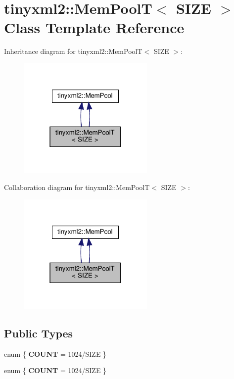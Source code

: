 \hypertarget{classtinyxml2_1_1MemPoolT}{}\section{tinyxml2\+:\+:Mem\+PoolT$<$ S\+I\+ZE $>$ Class Template Reference}
\label{classtinyxml2_1_1MemPoolT}


Inheritance diagram for tinyxml2\+:\+:Mem\+PoolT$<$ S\+I\+ZE $>$\+:
\nopagebreak
\begin{figure}[H]
\begin{center}
\leavevmode
\includegraphics[width=187pt]{classtinyxml2_1_1MemPoolT__inherit__graph}
\end{center}
\end{figure}


Collaboration diagram for tinyxml2\+:\+:Mem\+PoolT$<$ S\+I\+ZE $>$\+:
\nopagebreak
\begin{figure}[H]
\begin{center}
\leavevmode
\includegraphics[width=187pt]{classtinyxml2_1_1MemPoolT__coll__graph}
\end{center}
\end{figure}
\subsection*{Public Types}
\begin{DoxyCompactItemize}
\item 
\mbox{\label{classtinyxml2_1_1MemPoolT_a51bbb467703cd3d5aae62939f048a88f}} 
enum \{ {\bfseries C\+O\+U\+NT} = 1024/\+S\+I\+ZE
 \}
\item 
\mbox{\label{classtinyxml2_1_1MemPoolT_aaaf27e9fd46b0875905c929334344370}} 
enum \{ {\bfseries C\+O\+U\+NT} = 1024/\+S\+I\+ZE
 \}
\end{DoxyCompactItemize}
